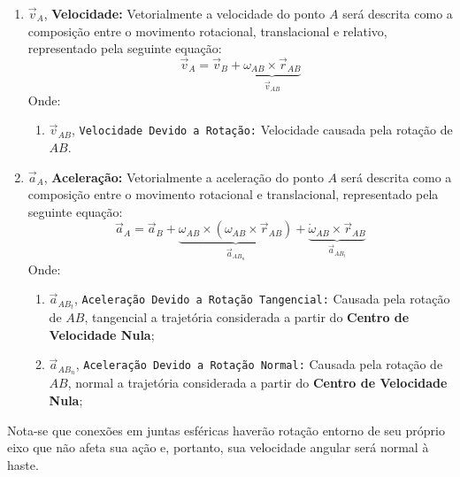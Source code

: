 \documentclass{article}
\begin{document}
                \begin{enumerate}[rightmargin = \leftmargin]
                    \item $\vec{v}_{A}$, \textbf{Velocidade:} Vetorialmente a velocidade do ponto $A$ será descrita como a composição entre o movimento rotacional,  translacional e relativo, representado pela seguinte equação:
                        \begin{equation}
                            \boxed{
                                \vec{v}_{A} = 
                                \vec{v}_{B} + 
                                \underbrace{
                                    \omega_{AB}\times\vec{r}_{AB}
                                }_{\vec{v}_{AB}}
                            }
                        \end{equation}
                    Onde:
                        \begin{enumerate}[rightmargin = \leftmargin, noitemsep]
                            \item $\vec{v}_{AB}$, \texttt{Velocidade Devido a Rotação:} Velocidade causada pela rotação de $AB$.
                        \end{enumerate}

                    \item $\vec{a}_{A}$, \textbf{Aceleração:} Vetorialmente a aceleração do ponto $A$ será descrita como a composição entre o movimento rotacional e translacional, representado pela seguinte equação:
                        \begin{equation}
                            \boxed{
                                \vec{a}_{A} = 
                                \vec{a}_{B} + 
                                \underbrace{
                                    \omega_{AB}\times(\omega_{AB}\times\vec{r}_{AB})
                                }_{\vec{a}_{AB_{n}}} + 
                                \underbrace{
                                    \dot{\omega}_{AB}\times\vec{r}_{AB}
                                }_{\vec{a}_{AB_{t}}}
                            }
                        \end{equation}
                    Onde:
                        \begin{enumerate}[rightmargin = \leftmargin]
                            \item $\vec{a}_{AB_{t}}$, \texttt{Aceleração Devido a Rotação Tangencial:} Causada pela rotação de $AB$, tangencial a trajetória considerada a partir do \textbf{Centro de Velocidade Nula};

                            \item $\vec{a}_{AB_{n}}$, \texttt{Aceleração Devido a Rotação Normal:} Causada pela rotação de $AB$, normal a trajetória considerada a partir do \textbf{Centro de Velocidade Nula};
                        \end{enumerate}
                \end{enumerate}
            Nota-se que conexões em juntas esféricas haverão rotação entorno de seu próprio eixo que não afeta sua ação e, portanto, sua velocidade angular será normal à haste.
\newpage
\end{document}
